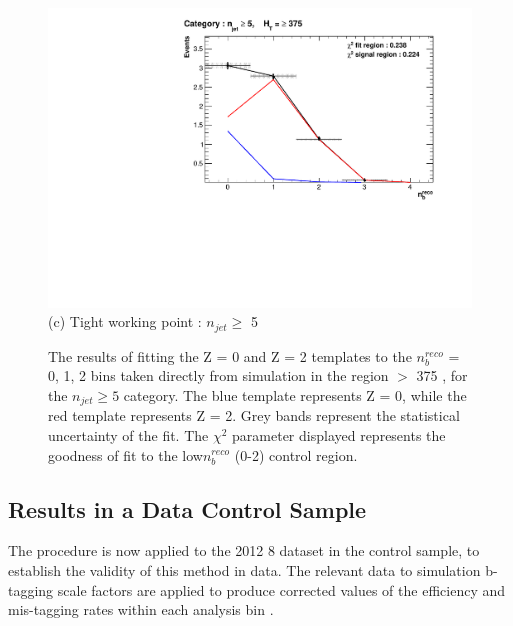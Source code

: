 \begin{figure}[ht]
\footnotesize
\centering
\begin{minipage}[b]{0.51\linewidth}
\centering
\includegraphics[width = 1.0\linewidth]{plots/ThesisPlots/Final_Fit_To_MC_Normal_Tight_HTBin_OneMuon_Template_375_jet_mult_5.pdf}
\centering (c) Tight working point : $n_{jet} \geq$ 5 
\end{minipage}
\caption[The results of fitting the Z = 0 and Z = 2 templates to the $n_{b}^{reco}$ = 0, 1, 2 bins taken directly from simulation in the region \theht $>$ 375 \GeV, for the $n_{jet} \geq 5$ category.]{The results of fitting the Z = 0 and Z = 2 templates to the $n_{b}^{reco}$ = 0, 1, 2 bins taken directly from simulation in the region \theht $>$ 375 \GeV, for the $n_{jet} \geq 5$ category. The blue template represents Z = 0, while the red template represents Z = 2. Grey bands represent the statistical uncertainty of the fit. The $\chi^{2}$ parameter displayed represents the goodness of fit to the low$ n_{b}^{reco}$ (0-2) control region.}
\label{fig:template_closure_njet5}
\end{figure}

\FloatBarrier
\subsection{Results in a Data Control Sample}
\label{subsec:templatedataresults}

The procedure is now applied to the 2012 8 \TeV dataset in the \mupjets control sample, to establish the validity of this method in data. The relevant data to simulation b-tagging scale factors are applied to produce corrected values of the efficiency and mis-tagging rates within each analysis bin \cite{btagscalefactor}. 

